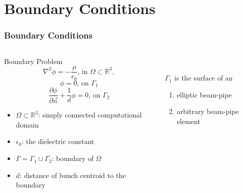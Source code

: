 \documentclass[xcolor=pdftex,table,10pt]{beamer}
\renewcommand {\Re}{{\mathbb{R}}}
\begin{document}
    \section{Boundary Conditions}
	
	\begin{frame}
		\frametitle{Boundary Conditions}

		\begin{columns}
		\begin{column}{5cm}

		\begin{block}{Boundary Problem}
            \[
	    		\nabla^2 \phi = -\frac{\rho}{\epsilon_0} \text{, in } \Omega \subset \Re^3 , \nonumber 
            \]
            \[
                \phi = 0 \text{, on }\Gamma_1  
            \]
            \[
                \frac{\partial \phi}{\partial \vec{n}} + \frac {1}{d} \phi = 0  \text{, on } \Gamma_2
            \]
		\end{block}
        \begin{itemize}
		\item $\Omega \subset \Re^3$: simply connected computational domain
		\item $\epsilon_0$: the dielectric constant
        \item $\Gamma= \Gamma_1 \cup \Gamma_2$: boundary of $\Omega$
        \item $d$: distance of bunch centroid to the boundary
        \end{itemize}
		
		\end{column}
		\begin{column}{5cm}
            \begin{center}
             \\
            \end{center}
            \vspace{0.2cm} 
			$\Gamma_1$ is the surface of an
    		\begin{enumerate}
	    		\item elliptic beam-pipe
		    	\item arbitrary beam-pipe element
    		\end{enumerate}
		\end{column}
		\end{columns}
		
	\end{frame}
	
\end{document}
